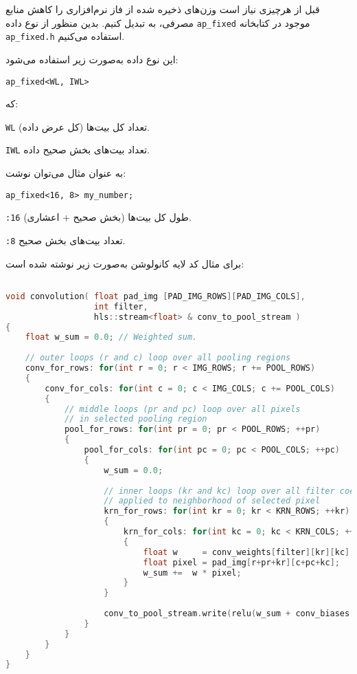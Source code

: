 قبل از هرچیزی نیاز است وزن‌های  ذخیره شده از فاز نرم‌افزاری را کاهش منابع مصرفی، به  تبدیل کنیم. بدین منظور از نوع داده \texttt{ap\_fixed} موجود در کتابخانه \texttt{ap\_fixed.h} استفاده می‌کنیم.


این نوع داده به‌صورت زیر استفاده می‌شود:

\begin{latin}
	\texttt{ap\_fixed<WL, IWL>}
\end{latin}

که:


 \texttt{WL} تعداد کل بیت‌ها (کل عرض داده).

 \texttt{IWL} تعداد بیت‌های بخش صحیح داده.


به عنوان مثال می‌توان نوشت:

\begin{latin}
	\texttt{ap\_fixed<16, 8> my\_number;}
\end{latin}


 \texttt{:16} طول کل بیت‌ها (بخش صحیح + اعشاری).

 \texttt{:8} تعداد بیت‌های بخش صحیح.



برای مثال کد لایه کانولوشن به‌صورت زیر نوشته شده است:




\begin{latin}
\begin{lstlisting}[language=C,caption={HLS Implementation of Convolution Layer}]

void convolution( float pad_img [PAD_IMG_ROWS][PAD_IMG_COLS],
				  int filter,
				  hls::stream<float> & conv_to_pool_stream )
{
	float w_sum = 0.0; // Weighted sum.
	
	// outer loops (r and c) loop over all pooling regions
	conv_for_rows: for(int r = 0; r < IMG_ROWS; r += POOL_ROWS)
	{
		conv_for_cols: for(int c = 0; c < IMG_COLS; c += POOL_COLS)
		{
			// middle loops (pr and pc) loop over all pixels
			// in selected pooling region
			pool_for_rows: for(int pr = 0; pr < POOL_ROWS; ++pr)
			{
				pool_for_cols: for(int pc = 0; pc < POOL_COLS; ++pc)
				{
					w_sum = 0.0;
					
					// inner loops (kr and kc) loop over all filter coefficients
					// applied to neighborhood of selected pixel
					krn_for_rows: for(int kr = 0; kr < KRN_ROWS; ++kr)
					{
						krn_for_cols: for(int kc = 0; kc < KRN_COLS; ++kc)
						{
							float w     = conv_weights[filter][kr][kc];
							float pixel = pad_img[r+pr+kr][c+pc+kc];
							w_sum +=  w * pixel;
						}
					}
					
					conv_to_pool_stream.write(relu(w_sum + conv_biases[filter]));
				}
			}
		}
	}
}
\end{lstlisting}
\end{latin}

